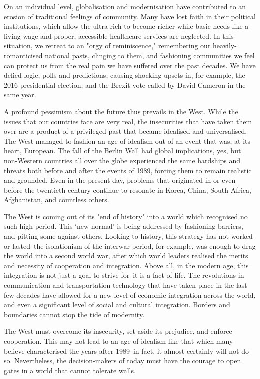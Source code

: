    On an individual level, globalisation and modernisation have
   contributed to an erosion of traditional feelings of community. Many
   have lost faith in their political institutions, which allow the
   ultra-rich to become richer while basic needs like a living wage and
   proper, accessible healthcare services are neglected. In this
   situation, we retreat to an "orgy of reminiscence," remembering our
   heavily-romanticised national pasts, clinging to them, and fashioning
   communities we feel can protect us from the real pain we have suffered
   over the past decades. We have defied logic, polls and predictions,
   causing shocking upsets in, for example, the 2016 presidential
   election, and the Brexit vote called by David Cameron in the same
   year.

   A profound pessimism about the future thus prevails in the West. While
   the issues that our countries face are very real, the insecurities that
   have taken them over are a product of a privileged past that became
   idealised and universalised. The West managed to fashion an age of
   idealism out of an event that was, at its heart, European. The fall of
   the Berlin Wall had global implications, yes, but non-Western countries
   all over the globe experienced the same hardships and threats both
   before and after the events of 1989, forcing them to remain realistic
   and grounded. Even in the present day, problems that originated in or
   even before the twentieth century continue to resonate in Korea, China,
   South Africa, Afghanistan, and countless others.

   The West is coming out of its "end of history" into a world which
   recognised no such high period. This `new normal' is being addressed by
   fashioning barriers, and pitting some against others. Looking to
   history, this strategy has not worked or lasted--the isolationism of
   the interwar period, for example, was enough to drag the world into a
   second world war, after which world leaders realised the merits and
   necessity of cooperation and integration. Above all, in the modern age,
   this integration is not just a goal to strive for--it is a fact of
   life. The revolutions in communication and transportation technology
   that have taken place in the last few decades have allowed for a new
   level of economic integration across the world, and even a significant
   level of social and cultural integration. Borders and boundaries cannot
   stop the tide of modernity. 
   
   The West must overcome its insecurity, set
   aside its prejudice, and enforce cooperation. This may not lead to an
   age of idealism like that which many believe characterised the years
   after 1989--in fact, it almost certainly will not do so. Nevertheless,
   the decision-makers of today must have the courage to open gates in a
   world that cannot tolerate walls.